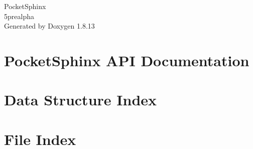 \documentclass[twoside]{book}
\newcommand{\+}{\discretionary{\mbox{\scriptsize$\hookleftarrow$}}{}{}}
\newcommand{\clearemptydoublepage}{%
  \newpage{\pagestyle{empty}\cleardoublepage}%
}
\begin{document}
\begin{titlepage}
\vspace*{7cm}
\begin{center}%
{\Large Pocket\+Sphinx \\[1ex]\large 5prealpha }\\
\vspace*{1cm}
{\large Generated by Doxygen 1.8.13}\\
\end{center}
\end{titlepage}
\clearemptydoublepage
{}
\tableofcontents
\clearemptydoublepage
{}

\chapter{Pocket\+Sphinx A\+PI Documentation}
\label{index}
\chapter{Data Structure Index}

\chapter{File Index}

\end{document}
